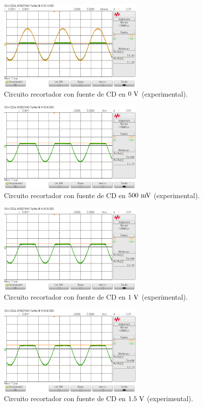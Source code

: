 \documentclass[journal]{IEEEtran}
\begin{document}
\begin{figure}[H]
        \centering
        \includegraphics[width=2.8in]{SignalExperimental_06.png}
        \caption{Circuito recortador con fuente de CD en $0~\textnormal{V}$ (experimental).}
        \label{fig:SignalExperimental_06}
\end{figure}
\begin{figure}[H]
        \centering
        \includegraphics[width=2.8in]{SignalExperimental_07.png}
        \caption{Circuito recortador con fuente de CD en $500~\textnormal{mV}$ (experimental).}
        \label{fig:SignalExperimental_07}
\end{figure}
\begin{figure}[H]
        \centering
        \includegraphics[width=2.8in]{SignalExperimental_08.png}
        \caption{Circuito recortador con fuente de CD en $1~\textnormal{V}$ (experimental).}
        \label{fig:SignalExperimental_08}
\end{figure}
\begin{figure}[H]
        \centering
        \includegraphics[width=2.8in]{SignalExperimental_09.png}
        \caption{Circuito recortador con fuente de CD en $1.5~\textnormal{V}$ (experimental).}
        \label{fig:SignalExperimental_09}
\end{figure}
\end{document}
